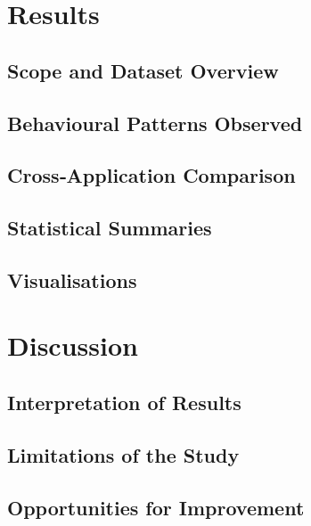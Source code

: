 \documentclass[a4paper,12pt]{report}
\begin{document}
\chapter{Results}
\section{Scope and Dataset Overview}\label{sec:results:dataset}

\section{Behavioural Patterns Observed}\label{sec:results:patterns}

\section{Cross‑Application Comparison}\label{sec:results:comparison}

\section{Statistical Summaries}\label{sec:results:stats}

\section{Visualisations}\label{sec:results:viz}

\chapter{Discussion}

\section{Interpretation of Results}

\section{Limitations of the Study}

\section{Opportunities for Improvement}
\end{document}
